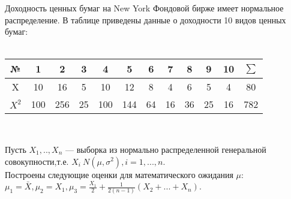 \documentclass[addpoints, answers]{exam} %
\begin{document}
\begin{questions}
\question  Доходность ценных бумаг на New York Фондовой бирже имеет нормальное распределение. В таблице приведены данные о доходности 10 видов ценных бумаг:\\ \\
\begin{tabular}{c|ccccccccccc}
  № & 1 & 2 & 3 & 4 & 5 & 6 & 7 & 8 & 9 & 10 & $\sum$ \\
  \hline
  X & 10 & 16 & 5 & 10 & 12 & 8 & 4 & 6 & 5 & 4 & 80 \\
  $X^2$ & 100 & 256 & 25 & 100 & 144 & 64 & 16 & 36 & 25 & 16 & 782\\
\end{tabular} \\

\question  Пусть $X_1,..,X_n$ --- выборка из нормально распределенной генеральной совокупности,т.е. $X_i~N(\mu,\sigma^2), i=1,...,n.$\\
Построены следующие оценки для математического ожидания $\mu$:\\
$\mu_1=\bar{X}, \mu_2=X_1, \mu_3=\frac{X_1}{2}+\frac{1}{2(n-1)}(X_2+...+X_n)$.


\end{questions}
\end{document}
